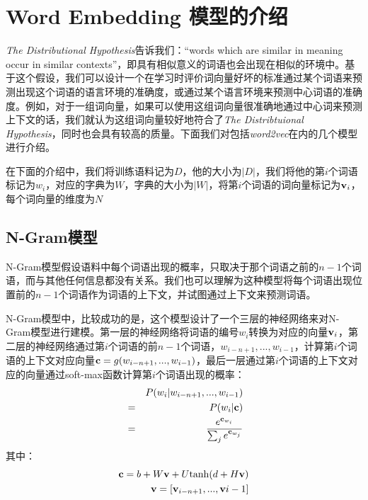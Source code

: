 \iffalse



\fi

\chapter{Word Embedding 模型的介绍}
\label{chap:w2v}

\emph{The Distributional Hypothesis}告诉我们：``words which are similar in meaning occur in similar contexts''\citep{rubenstein1965contextual}，即具有相似意义的词语也会出现在相似的环境中。基于这个假设，我们可以设计一个在学习时评价词向量好坏的标准\mydash 通过某个词语来预测出现这个词语的语言环境的准确度，或通过某个语言环境来预测中心词语的准确度。例如，对于一组词向量，如果可以使用这组词向量很准确地通过中心词来预测上下文的话，我们就认为这组词向量较好地符合了\emph{The Distribtuional Hypothesis}，同时也会具有较高的质量。下面我们对包括\emph{word2vec}在内的几个模型进行介绍。

在下面的介绍中，我们将训练语料记为$D$，他的大小为$|D|$，我们将他的第$i$个词语标记为$w_i$，对应的字典为$W$，字典的大小为$|W|$，将第$i$个词语的词向量标记为${{\mathbf v}}_i$，每个词向量的维度为$N$

\section{N-Gram模型}

N-Gram模型假设语料中每个词语出现的概率，只取决于那个词语之前的$n-1$个词语，而与其他任何信息都没有关系。我们也可以理解为这种模型将每个词语出现位置前的$n-1$个词语作为词语的上下文，并试图通过上下文来预测词语。

N-Gram模型中，比较成功的是\cite{bengio2006neural}，这个模型设计了一个三层的神经网络来对N-Gram模型进行建模。第一层的神经网络将词语的编号$w_i$转换为对应的向量${{\mathbf v}}_i$，第二层的神经网络通过第$i$个词语的前$n-1$个词语，$w_{i-n+1}, ... , w_{i-1}$，计算第$i$个词语的上下文对应向量${{\mathbf c}} = g(w_{i-n+1}, ..., w_{i-1})$，最后一层通过第$i$个词语的上下文对应的向量通过soft-max函数计算第$i$个词语出现的概率：
\begin{eqnarray*}
&&P(w_i| w_{i-n+1}, ..., w_{i-1}) \\
&=& P(w_i | {{\mathbf c}}) \\
&=& \frac{e^{{{\mathbf c}}_{w_i}}}{\sum_j e^{{{\mathbf c}}_{w_j}}}
\end{eqnarray*}
其中：
\begin{eqnarray*}
{{\mathbf c}} = b + W{{\mathbf v}} + U \mathrm{tanh}(d+H{{\mathbf v}}) \\
{{\mathbf v}} = [{{\mathbf v}}_{i-n+1}, ..., {{\mathbf v}}{i-1}]
\end{eqnarray*}

